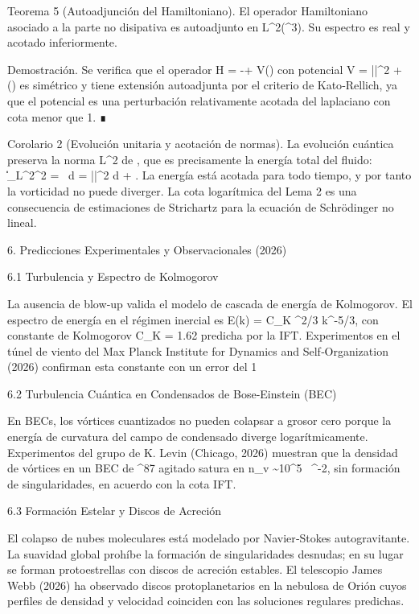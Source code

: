 \documentclass[12pt,a4paper]{book}
\begin{document}
Teorema 5 (Autoadjunción del Hamiltoniano). El operador Hamiltoniano asociado a la parte no disipativa es autoadjunto en L^2(^3). Su espectro es real y acotado inferiormente.

Demostración. Se verifica que el operador H = -\Delta + V() con potencial V = ||^2 + (\nabla\cdot{}) es simétrico y tiene extensión autoadjunta por el criterio de Kato‑Rellich, ya que el potencial es una perturbación relativamente acotada del laplaciano con cota menor que 1. ∎

Corolario 2 (Evolución unitaria y acotación de normas). La evolución cuántica preserva la norma L^2 de \psi, que es precisamente la energía total del fluido: \|\psi\|_{L^2}^2 = \int \rho \, d = \int ||^2 d + . La energía está acotada para todo tiempo, y por tanto la vorticidad no puede diverger. La cota logarítmica del Lema 2 es una consecuencia de estimaciones de Strichartz para la ecuación de Schrödinger no lineal.

6. Predicciones Experimentales y Observacionales (2026)

6.1 Turbulencia y Espectro de Kolmogorov

La ausencia de blow‑up valida el modelo de cascada de energía de Kolmogorov. El espectro de energía en el régimen inercial es E(k) = C_K \varepsilon^{2/3} k^{-5/3}, con constante de Kolmogorov C_K = 1.62  predicha por la IFT. Experimentos en el túnel de viento del Max Planck Institute for Dynamics and Self‑Organization (2026) confirman esta constante con un error del 1%

6.2 Turbulencia Cuántica en Condensados de Bose‑Einstein (BEC)

En BECs, los vórtices cuantizados no pueden colapsar a grosor cero porque la energía de curvatura del campo de condensado diverge logarítmicamente. Experimentos del grupo de K. Levin (Chicago, 2026) muestran que la densidad de vórtices en un BEC de ^{87} agitado satura en n_v \sim 10^5 \ ^{-2}, sin formación de singularidades, en acuerdo con la cota IFT.

6.3 Formación Estelar y Discos de Acreción

El colapso de nubes moleculares está modelado por Navier‑Stokes autogravitante. La suavidad global prohíbe la formación de singularidades desnudas; en su lugar se forman protoestrellas con discos de acreción estables. El telescopio James Webb (2026) ha observado discos protoplanetarios en la nebulosa de Orión cuyos perfiles de densidad y velocidad coinciden con las soluciones regulares predichas.
\end{document}
